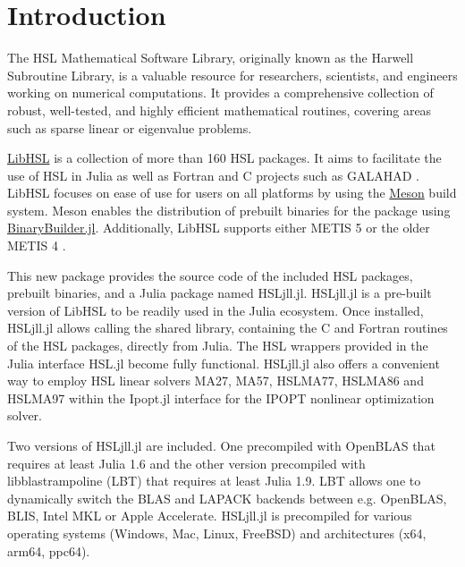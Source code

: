\documentclass[gdweb]{geradwp}
\renewcommand{\_}{\raisebox{+0.35mm}{\textunderscore}}
\newcommand{\LibHSL}{LibHSL\xspace}
\newcommand{\HSLjll}{HSL\_jll.jl\xspace}
\begin{document}

\GDarticlestart

\section{Introduction}

The HSL Mathematical Software Library, originally known as the Harwell Subroutine Library, is a valuable resource for researchers, scientists, and engineers working on numerical computations.
It provides a comprehensive collection of robust, well-tested, and highly efficient mathematical routines, covering areas such as sparse linear or eigenvalue problems.

\href{https://licences.stfc.ac.uk/product/libhsl}{\LibHSL} is a collection of more than 160 HSL packages.
It aims to facilitate the use of HSL in Julia \citep{bezanson-edelman-karpinski-shah-2017} as well as Fortran and C projects such as GALAHAD \citep{gould-orban-toint-2003}.
\LibHSL focuses on ease of use for users on all platforms by using the \href{https://github.com/mesonbuild/meson}{Meson} build system.
Meson enables the distribution of prebuilt binaries for the package using \href{https://github.com/JuliaPackaging/BinaryBuilder.jl}{BinaryBuilder.jl}.
Additionally, \LibHSL supports either METIS 5 or the older METIS 4 \citep{karypis-kumar-1998}.

This new package provides the source code of the included HSL packages, prebuilt binaries, and a Julia package named \HSLjll.
\HSLjll is a pre-built version of \LibHSL to be readily used in the Julia ecosystem.
Once installed, \HSLjll allows calling the shared library, containing the C and Fortran routines of the HSL packages, directly from Julia.
The HSL wrappers provided in the Julia interface HSL.jl become fully functional.
\HSLjll also offers a convenient way to employ HSL linear solvers MA27, MA57, HSL\_MA77, HSL\_MA86 and HSL\_MA97 within the Ipopt.jl interface for the IPOPT \citep{wachter-2006} nonlinear optimization solver.

Two versions of \HSLjll are included. One precompiled with OpenBLAS that requires at least Julia 1.6 and the other version precompiled with libblastrampoline (LBT) that requires at least Julia 1.9.
LBT allows one to dynamically switch the BLAS and LAPACK backends between e.g. OpenBLAS, BLIS, Intel MKL or Apple Accelerate.
\HSLjll is precompiled for various operating systems (Windows, Mac, Linux, FreeBSD) and architectures (x64, arm64, ppc64).
\end{document}
